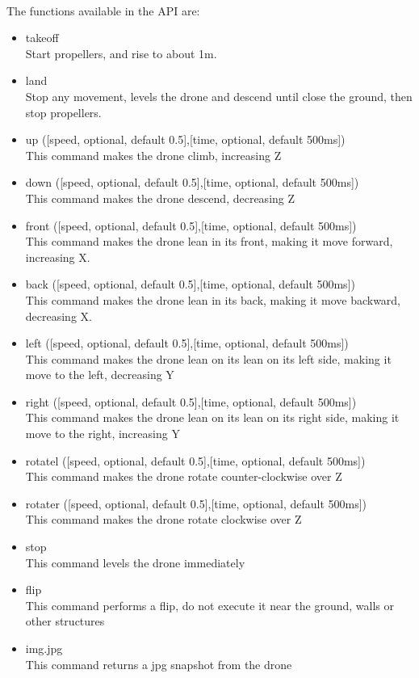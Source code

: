 \documentclass[11pt,twoside,a4paper]{article}
\begin{document}
\paragraph {} The functions available in the API are:
\begin{itemize}
\item takeoff\\Start propellers, and rise to about 1m.
\item land\\Stop any movement, levels the drone and descend until close the
ground, then stop propellers.
\item up ([speed, optional, default 0.5],[time, optional, default 500ms])\\
This command makes the drone climb, increasing Z
\item down ([speed, optional, default 0.5],[time, optional, default 500ms])\\
This command makes the drone descend, decreasing Z
\item front ([speed, optional, default 0.5],[time, optional, default 500ms])\\
This command makes the drone lean in its front, making it move forward,
increasing X.
\item back ([speed, optional, default 0.5],[time, optional, default 500ms])\\
This command makes the drone lean in its back, making it move backward,
decreasing X.
\item left ([speed, optional, default 0.5],[time, optional, default 500ms])\\
This command makes the drone lean on its lean on its left side, making it move
to the left, decreasing Y
\item right ([speed, optional, default 0.5],[time, optional, default 500ms])\\
This command makes the drone lean on its lean on its right side, making it move
to the right, increasing Y
\item rotatel ([speed, optional, default 0.5],[time, optional, default 500ms])\\
This command makes the drone rotate counter-clockwise over Z
\item rotater ([speed, optional, default 0.5],[time, optional, default 500ms])\\
This command makes the drone rotate clockwise over Z
\item stop\\
This command levels the drone immediately
\item flip\\
This command performs a flip, do not execute it near the ground, walls or other
structures
\item img.jpg\\
This command returns a jpg snapshot from the drone
\end{itemize}
\end{document}
